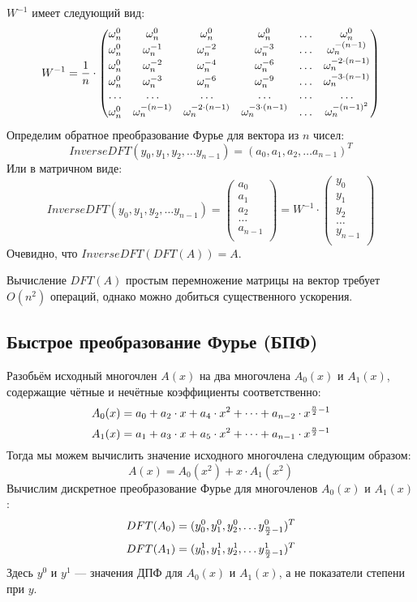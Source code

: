 $W^{-1}$ имеет следующий вид:
$$ W^{-1} = {1 \over n} \cdot
\begin{pmatrix}
{\omega}_{n} ^ {0} & {\omega}_{n} ^ {0} & {\omega}_{n} ^ {0} & {\omega}_{n} ^ {0} & \dots & {\omega}_{n} ^ {0} \\
{\omega}_{n} ^ {0} & {\omega}_{n} ^ {-1} & {\omega}_{n} ^ {-2} & {\omega}_{n} ^ {-3} & \dots & {\omega}_{n} ^ {-(n - 1)} \\
{\omega}_{n} ^ {0} & {\omega}_{n} ^ {-2} & {\omega}_{n} ^ {-4} & {\omega}_{n} ^ {-6} & \dots & {\omega}_{n} ^ {-2 \cdot (n - 1)} \\
{\omega}_{n} ^ {0} & {\omega}_{n} ^ {-3} & {\omega}_{n} ^ {-6} & {\omega}_{n} ^ {-9} & \dots & {\omega}_{n} ^ {-3 \cdot (n - 1)} \\
\dots & \dots & \dots & \dots & \dots & \dots \\
{\omega}_{n} ^ {0} & {\omega}_{n} ^ {-(n - 1)} & {\omega}_{n} ^ {-2 \cdot (n - 1)} & {\omega}_{n} ^ {-3 \cdot (n - 1)} & \dots & {\omega}_{n} ^ {-(n - 1) ^ 2}
\end{pmatrix}
$$
Определим обратное преобразование Фурье для вектора из $n$ чисел:
$$
InverseDFT( y_0, y_1, y_2, \dots y_{n - 1} ) = (a_0, a_1, a_2, \dots a_{n - 1}) ^ T
$$
Или в матричном виде:
$$
InverseDFT( y_0, y_1, y_2, \dots y_{n - 1} ) =
\begin{pmatrix}
a_0 \\
a_1 \\
a_2 \\
\dots \\
a_{n - 1} \\
\end{pmatrix}
=
W^{-1} \cdot
\begin{pmatrix}
y_0 \\
y_1 \\
y_2 \\
\dots \\
y_{n - 1} \\
\end{pmatrix}
$$
Очевидно, что $InverseDFT(DFT(A)) = A$.

Вычисление $DFT(A)$ простым перемножение матрицы на вектор требует $O(n ^ 2)$ операций, однако можно добиться существенного ускорения.

\pagebreak

\subsection*{Быстрое преобразование Фурье (БПФ)}
Разобьём исходный многочлен $A(x)$ на два многочлена $A_0(x)$ и $A_1(x)$, содержащие чётные и нечётные коэффициенты соответственно:
$$A_0(x) = a_0 + a_2 \cdot x + a_4 \cdot x ^ 2 + \dots + a_{n - 2} \cdot x ^ {{n \over 2} - 1}$$
$$A_1(x) = a_1 + a_3 \cdot x + a_5 \cdot x ^ 2 + \dots + a_{n - 1} \cdot x ^ {{n \over 2} - 1}$$
Тогда мы можем вычислить значение исходного многочлена следующим образом:
$$ A(x) = A_0(x ^ 2) + x \cdot A_1(x ^ 2) $$
Вычислим дискретное преобразование Фурье для многочленов $A_0(x)$ и $A_1(x)$:
$$ DFT(A_0) = (y^0_0, y^0_1, y^0_2, \dots y^0_{ {n \over 2} - 1}) ^ T $$
$$ DFT(A_1) = (y^1_0, y^1_1, y^1_2, \dots y^1_{ {n \over 2} - 1}) ^ T $$
Здесь $y^0$ и $y^1$ --- значения ДПФ для $A_0(x)$ и $A_1(x)$, а не показатели степени при $y$.

